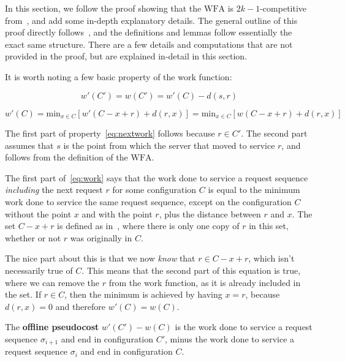 In this section, we follow the proof showing that the $\mathrm{WFA}$ is $2k-1$-competitive from~\cite{OnlineComp1998}, and add some in-depth explanatory details. The general outline of this proof directly follows~\cite{OnlineComp1998}, and the definitions and lemmas follow essentially the exact same structure. There are a few details and computations that are not provided in the proof, but are explained in-detail in this section.

It is worth noting a few basic property of the work function:

\begin{equation}
    \label{eq:nextwork}
    w'(C') = w(C') = w'(C) - d(s,r)
\end{equation}

\begin{equation}
    \label{eq:work}
    w'(C) = \mathrm{min}_{x \in C} [w'(C - x + r) + d(r, x)] = \mathrm{min}_{x \in C} [w(C - x + r) + d(r, x)]
\end{equation}

The first part of property~\eqref{eq:nextwork} follows because $r \in C'$. The second part assumes that $s$ is the point from which the server that moved to service $r$, and follows from the definition of the $\mathrm{WFA}$.

The first part of~\eqref{eq:work} says that the work done to service a request sequence \textit{including} the next request $r$ for some configuration $C$ is equal to the minimum work done to service the same request sequence, except on the configuration $C$ without the point $x$ and with the point $r$, plus the distance between $r$ and $x$. The set $C-x+r$ is defined as in~\cite{OnlineComp1998}, where there is only one copy of $r$ in this set, whether or not $r$ was originally in $C$. 

The nice part about this is that we now \textit{know} that $r \in C - x + r$, which isn't necessarily true of $C$. This means that the second part of this equation is true, where we can remove the $r$ from the work function, as it is already included in the set. If $r \in C$, then the minimum is achieved by having $x = r$, because $d(r,x) = 0$ and therefore $w'(C) = w(C)$.

\begin{definition}
    The \textbf{offline pseudocost} $w'(C') - w(C)$ is the work done to service a request sequence $\sigma_{i+1}$ and end in configuration $C'$, minus the work done to service a request sequence $\sigma_i$ and end in configuration $C$.
\end{definition}

